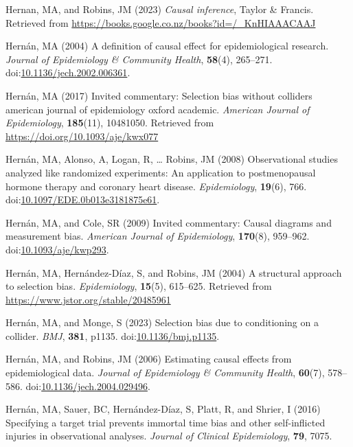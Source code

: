 \documentclass[
  singlecolumn,
  9pt]{article}
\begin{document}
\begin{CSLReferences}
Hernan, MA, and Robins, JM (2023) \emph{Causal inference}, Taylor \&
Francis. Retrieved from
\url{https://books.google.co.nz/books?id=/_KnHIAAACAAJ}

Hernán, MA (2004) A definition of causal effect for epidemiological
research. \emph{Journal of Epidemiology \& Community Health},
\textbf{58}(4), 265--271.
doi:\href{https://doi.org/10.1136/jech.2002.006361}{10.1136/jech.2002.006361}.

Hernán, MA (2017) Invited commentary: Selection bias without colliders
\textbar{} american journal of epidemiology \textbar{} oxford academic.
\emph{American Journal of Epidemiology}, \textbf{185}(11), 10481050.
Retrieved from \url{https://doi.org/10.1093/aje/kwx077}

Hernán, MA, Alonso, A, Logan, R, \ldots{} Robins, JM (2008)
Observational studies analyzed like randomized experiments: An
application to postmenopausal hormone therapy and coronary heart
disease. \emph{Epidemiology}, \textbf{19}(6), 766.
doi:\href{https://doi.org/10.1097/EDE.0b013e3181875e61}{10.1097/EDE.0b013e3181875e61}.

Hernán, MA, and Cole, SR (2009) Invited commentary: Causal diagrams and
measurement bias. \emph{American Journal of Epidemiology},
\textbf{170}(8), 959--962.
doi:\href{https://doi.org/10.1093/aje/kwp293}{10.1093/aje/kwp293}.

Hernán, MA, Hernández-Díaz, S, and Robins, JM (2004) A structural
approach to selection bias. \emph{Epidemiology}, \textbf{15}(5),
615--625. Retrieved from \url{https://www.jstor.org/stable/20485961}

Hernán, MA, and Monge, S (2023) Selection bias due to conditioning on a
collider. \emph{BMJ}, \textbf{381}, p1135.
doi:\href{https://doi.org/10.1136/bmj.p1135}{10.1136/bmj.p1135}.

Hernán, MA, and Robins, JM (2006) Estimating causal effects from
epidemiological data. \emph{Journal of Epidemiology \& Community
Health}, \textbf{60}(7), 578--586.
doi:\href{https://doi.org/10.1136/jech.2004.029496}{10.1136/jech.2004.029496}.

Hernán, MA, Sauer, BC, Hernández-Díaz, S, Platt, R, and Shrier, I (2016)
Specifying a target trial prevents immortal time bias and other
self-inflicted injuries in observational analyses. \emph{Journal of
Clinical Epidemiology}, \textbf{79}, 7075.


\end{CSLReferences}
\end{document}
